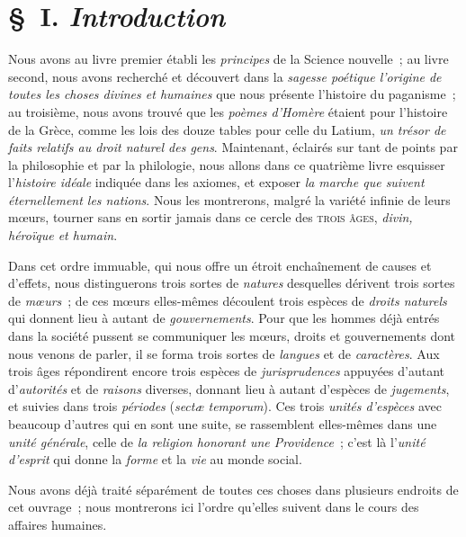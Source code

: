 \documentclass[french,twoside]{book} %
\begin{document}
\section[{§ I. Introduction}]{§ I. {\itshape Introduction}}
\noindent  Nous avons au livre premier établi les {\itshape principes} de la Science nouvelle ; au livre second, nous avons recherché et découvert dans la {\itshape sagesse poétique l’origine de toutes les choses divines et humaines} que nous présente l’histoire du paganisme ; au troisième, nous avons trouvé que les {\itshape poèmes d’Homère} étaient pour l’histoire de la Grèce, comme les lois des douze tables pour celle du Latium, {\itshape un trésor de faits relatifs au droit naturel des gens}. Maintenant, éclairés sur tant de points par la philosophie et par la philologie, nous allons dans ce quatrième livre esquisser l’{\itshape histoire idéale} indiquée dans les axiomes, et exposer {\itshape la marche que suivent éternellement les nations}. Nous les montrerons, malgré la variété infinie de leurs mœurs, tourner sans en sortir jamais dans ce cercle des {\scshape trois âges}, {\itshape divin, héroïque et humain}.\par
 Dans cet ordre immuable, qui nous offre un étroit enchaînement de causes et d’effets, nous distinguerons trois sortes de {\itshape natures} desquelles dérivent trois sortes de {\itshape mœurs} ; de ces mœurs elles-mêmes découlent trois espèces de {\itshape droits naturels} qui donnent lieu à autant de {\itshape gouvernements}. Pour que les hommes déjà entrés dans la société pussent se communiquer les mœurs, droits et gouvernements dont nous venons de parler, il se forma trois sortes de {\itshape langues} et de {\itshape caractères}. Aux trois âges répondirent encore trois espèces de {\itshape jurisprudences} appuyées d’autant d’{\itshape autorités} et de {\itshape raisons} diverses, donnant lieu à autant d’espèces de {\itshape jugements}, et suivies dans trois {\itshape périodes} ({\itshape sectæ temporum}). Ces trois {\itshape unités d’espèces} avec beaucoup d’autres qui en sont une suite, se rassemblent elles-mêmes dans une {\itshape unité générale}, celle de {\itshape la religion honorant une Providence} ; c’est là l’{\itshape unité d’esprit} qui donne la {\itshape forme} et la {\itshape vie} au monde social.\par
Nous avons déjà traité séparément de toutes ces choses dans plusieurs endroits de cet ouvrage ; nous montrerons ici l’ordre qu’elles suivent dans le cours des affaires humaines.
\end{document}
